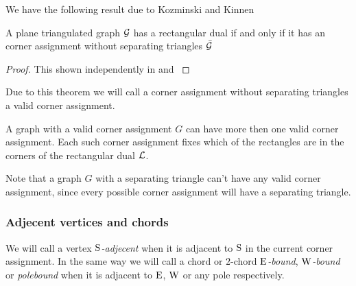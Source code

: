   We have the following result due to Kozminski and Kinnen

  \begin{thrm}
    A plane triangulated graph $\mathcal{G}$ has a rectangular dual if and only if it has an corner assignment without separating triangles $\bar{\mathcal{G}}$
  \end{thrm}

  \begin{proof}
    This shown independently in \cite{Kozminski1984} and  \cite{Ungar1953}
  \end{proof}

  Due to this theorem we will call a corner assignment without separating triangles a valid corner assignment.

  A graph with a valid corner assignment $G$ can have more then one valid corner assignment. Each such corner assignment fixes which of the rectangles are in the corners of the rectangular dual $\mathcal{L}$.

  Note that a graph $G$ with a separating triangle can't have any valid corner assignment, since every possible corner assignment will have a separating triangle.

  \subsubsection{Adjecent vertices and chords}
  We will call a vertex \emph{$\mathrm{S}$-adjecent} when it is adjacent to $\mathrm{S}$ in the current corner assignment. In the same way we will call a chord or $2$-chord \emph{$\mathrm{E}$-bound}, \emph{$\mathrm{W}$-bound} or \emph{polebound} when it is adjacent to $\mathrm{E}$, $\mathrm{W}$ or any pole respectively.
